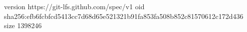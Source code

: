 version https://git-lfs.github.com/spec/v1
oid sha256:efb6fcbfcd5413cc7d68d65e521321b91fa853fa508b852c81570612c172d436
size 1398246
